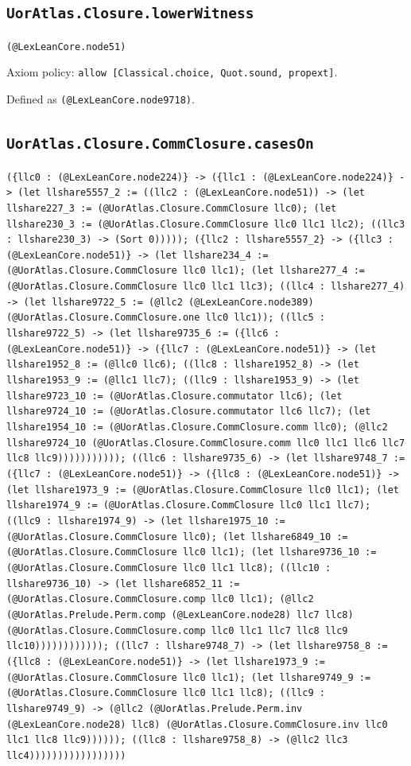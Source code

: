 \documentclass[11pt]{article}
\begin{document}
\subsection*{\texttt{UorAtlas.Closure.lowerWitness}}
\noindent\texttt{(@LexLeanCore.node51)}\par
\noindent Axiom policy: \texttt{allow [Classical.choice, Quot.sound, propext]}.\par
\noindent Defined as \texttt{(@LexLeanCore.node9718)}.\par
\subsection*{\texttt{UorAtlas.Closure.CommClosure.casesOn}}
\noindent\texttt{(\{llc0 : (@LexLeanCore.node224)\} -> (\{llc1 : (@LexLeanCore.node224)\} -> (let llshare5557\_2 := ((llc2 : (@LexLeanCore.node51)) -> (let llshare227\_3 := (@UorAtlas.Closure.CommClosure llc0); (let llshare230\_3 := (@UorAtlas.Closure.CommClosure llc0 llc1 llc2); ((llc3 : llshare230\_3) -> (Sort 0))))); (\{llc2 : llshare5557\_2\} -> (\{llc3 : (@LexLeanCore.node51)\} -> (let llshare234\_4 := (@UorAtlas.Closure.CommClosure llc0 llc1); (let llshare277\_4 := (@UorAtlas.Closure.CommClosure llc0 llc1 llc3); ((llc4 : llshare277\_4) -> (let llshare9722\_5 := (@llc2 (@LexLeanCore.node389) (@UorAtlas.Closure.CommClosure.one llc0 llc1)); ((llc5 : llshare9722\_5) -> (let llshare9735\_6 := (\{llc6 : (@LexLeanCore.node51)\} -> (\{llc7 : (@LexLeanCore.node51)\} -> (let llshare1952\_8 := (@llc0 llc6); ((llc8 : llshare1952\_8) -> (let llshare1953\_9 := (@llc1 llc7); ((llc9 : llshare1953\_9) -> (let llshare9723\_10 := (@UorAtlas.Closure.commutator llc6); (let llshare9724\_10 := (@UorAtlas.Closure.commutator llc6 llc7); (let llshare1954\_10 := (@UorAtlas.Closure.CommClosure.comm llc0); (@llc2 llshare9724\_10 (@UorAtlas.Closure.CommClosure.comm llc0 llc1 llc6 llc7 llc8 llc9))))))))))); ((llc6 : llshare9735\_6) -> (let llshare9748\_7 := (\{llc7 : (@LexLeanCore.node51)\} -> (\{llc8 : (@LexLeanCore.node51)\} -> (let llshare1973\_9 := (@UorAtlas.Closure.CommClosure llc0 llc1); (let llshare1974\_9 := (@UorAtlas.Closure.CommClosure llc0 llc1 llc7); ((llc9 : llshare1974\_9) -> (let llshare1975\_10 := (@UorAtlas.Closure.CommClosure llc0); (let llshare6849\_10 := (@UorAtlas.Closure.CommClosure llc0 llc1); (let llshare9736\_10 := (@UorAtlas.Closure.CommClosure llc0 llc1 llc8); ((llc10 : llshare9736\_10) -> (let llshare6852\_11 := (@UorAtlas.Closure.CommClosure.comp llc0 llc1); (@llc2 (@UorAtlas.Prelude.Perm.comp (@LexLeanCore.node28) llc7 llc8) (@UorAtlas.Closure.CommClosure.comp llc0 llc1 llc7 llc8 llc9 llc10)))))))))))); ((llc7 : llshare9748\_7) -> (let llshare9758\_8 := (\{llc8 : (@LexLeanCore.node51)\} -> (let llshare1973\_9 := (@UorAtlas.Closure.CommClosure llc0 llc1); (let llshare9749\_9 := (@UorAtlas.Closure.CommClosure llc0 llc1 llc8); ((llc9 : llshare9749\_9) -> (@llc2 (@UorAtlas.Prelude.Perm.inv (@LexLeanCore.node28) llc8) (@UorAtlas.Closure.CommClosure.inv llc0 llc1 llc8 llc9)))))); ((llc8 : llshare9758\_8) -> (@llc2 llc3 llc4)))))))))))))))))}\par
\end{document}
